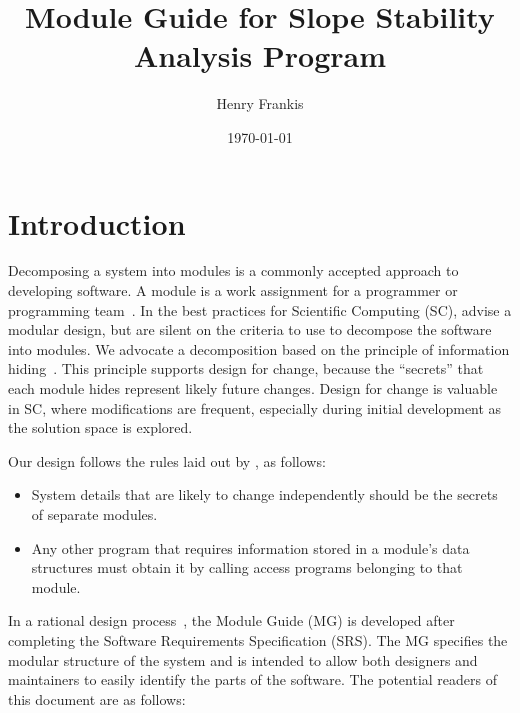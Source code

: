 \documentclass[12pt]{article}
\begin{document}
\title{Module Guide for Slope Stability Analysis Program} 
\author{Henry Frankis}
\date{\today}
	
\maketitle

\tableofcontents

\newpage

\section{Introduction}

\hspace{3ex}Decomposing a system into modules is a commonly accepted
approach to developing software.  A module is a work assignment for a
programmer or programming team~\citep{ParnasEtAl1984}.  In the best
practices for Scientific Computing (SC), \citet{WilsonEtAl2013} advise a
modular design, but are silent on the criteria to use to decompose the
software into modules.  We advocate a decomposition based on the
principle of information hiding~\citep{Parnas1972a}.  This principle
supports design for change, because the ``secrets'' that each module
hides represent likely future changes.  Design for change is valuable
in SC, where modifications are frequent, especially during initial
development as the solution space is explored.

Our design follows the rules laid out by \citet{ParnasEtAl1984}, as follows:
\begin{itemize}  
\item System details that are likely to change independently should be
  the secrets of separate modules.
\item Any other program that requires information stored in a module's
  data structures must obtain it by calling access programs belonging
  to that module.
\end{itemize}

In a rational design process~\citep{ParnasEtAl1984}, the Module Guide (MG) is developed after completing the Software Requirements Specification (SRS). The MG specifies the modular
structure of the system and is intended to allow both designers and
maintainers to easily identify the parts of the software.  The
potential readers of this document are as follows:
\end{document}
